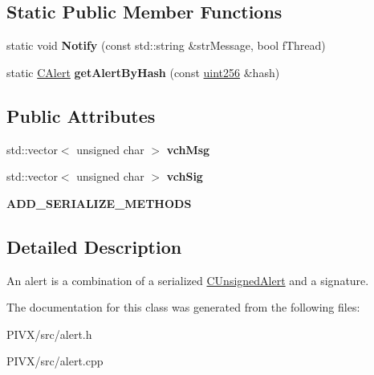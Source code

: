 \subsection*{Static Public Member Functions}
\begin{DoxyCompactItemize}
\item 
\mbox{\label{class_c_alert_a3da23857c8ed275621ee032a703c04a1}} 
static void {\bfseries Notify} (const std\+::string \&str\+Message, bool f\+Thread)
\item 
\mbox{\label{class_c_alert_aa37df9d177a6841ec5fa1e611c42b968}} 
static \mbox{\hyperlink{class_c_alert}{C\+Alert}} {\bfseries get\+Alert\+By\+Hash} (const \mbox{\hyperlink{classuint256}{uint256}} \&hash)
\end{DoxyCompactItemize}
\subsection*{Public Attributes}
\begin{DoxyCompactItemize}
\item 
\mbox{\label{class_c_alert_abfcb3b339d052cd3dd6670b03286758a}} 
std\+::vector$<$ unsigned char $>$ {\bfseries vch\+Msg}
\item 
\mbox{\label{class_c_alert_a541b49670ebf387a5f8b7de59277fed0}} 
std\+::vector$<$ unsigned char $>$ {\bfseries vch\+Sig}
\item 
\mbox{\label{class_c_alert_aca9310112e67fb38ef88f385a4ac6fc0}} 
{\bfseries A\+D\+D\+\_\+\+S\+E\+R\+I\+A\+L\+I\+Z\+E\+\_\+\+M\+E\+T\+H\+O\+DS}
\end{DoxyCompactItemize}


\subsection{Detailed Description}
An alert is a combination of a serialized \mbox{\hyperlink{class_c_unsigned_alert}{C\+Unsigned\+Alert}} and a signature. 

The documentation for this class was generated from the following files\+:\begin{DoxyCompactItemize}
\item 
P\+I\+V\+X/src/alert.\+h\item 
P\+I\+V\+X/src/alert.\+cpp\end{DoxyCompactItemize}
